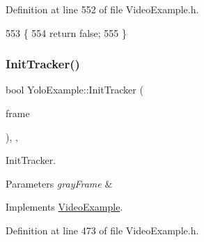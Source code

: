 Definition at line 552 of file Video\+Example.\+h.


\begin{DoxyCode}
553     \{
554         \textcolor{keywordflow}{return} \textcolor{keyword}{false};
555     \}
\end{DoxyCode}
\mbox{\label{class_yolo_example_a60980995a54b8bcfcf94bd4e04d0eeaa}} 
\subsubsection{\texorpdfstring{Init\+Tracker()}{InitTracker()}}
{\footnotesize\ttfamily bool Yolo\+Example\+::\+Init\+Tracker (\begin{DoxyParamCaption}\item[{cv\+::\+U\+Mat}]{frame }\end{DoxyParamCaption})\hspace{0.3cm}{\ttfamily [inline]}, {\ttfamily [protected]}, {\ttfamily [virtual]}}



Init\+Tracker. 


\begin{DoxyParams}{Parameters}
{\em gray\+Frame} & \\
\hline
\end{DoxyParams}


Implements \mbox{\hyperlink{class_video_example_a93e23d64075fb2f508423e45d15c5421}{Video\+Example}}.



Definition at line 473 of file Video\+Example.\+h.


